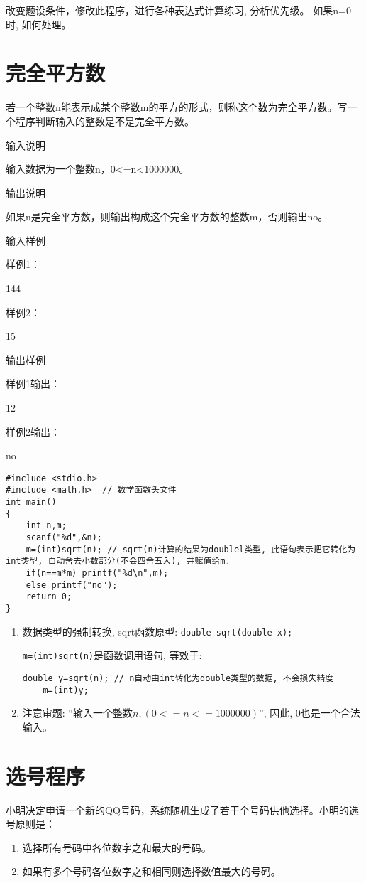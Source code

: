 \begin{note}
	改变题设条件，修改此程序，进行各种表达式计算练习, 分析优先级。 如果n=0时, 如何处理。
\end{note}

\section{完全平方数}
若一个整数n能表示成某个整数m的平方的形式，则称这个数为完全平方数。写一个程序判断输入的整数是不是完全平方数。

输入说明
	
输入数据为一个整数n，0<=n<1000000。

输出说明
	
如果n是完全平方数，则输出构成这个完全平方数的整数m，否则输出no。

输入样例
	
样例1：

144

样例2：

15

输出样例
	
样例1输出：

12

样例2输出：

no

\begin{lstlisting}
#include <stdio.h>
#include <math.h>  // 数学函数头文件
int main()
{
	int n,m;
	scanf("%d",&n);
	m=(int)sqrt(n); // sqrt(n)计算的结果为doublel类型, 此语句表示把它转化为int类型, 自动舍去小数部分(不会四舍五入), 并赋值给m。
	if(n==m*m) printf("%d\n",m);
	else printf("no");
	return 0;
} 
\end{lstlisting}

\begin{note}[要点]
	\begin{enumerate}
	\item 数据类型的强制转换, sqrt函数原型: \lstinline|double sqrt(double x);|
	
	\lstinline|m=(int)sqrt(n)|是函数调用语句, 等效于:
	\begin{lstlisting}[frame=none]
	double y=sqrt(n); // n自动由int转化为double类型的数据, 不会损失精度
	m=(int)y; 
	\end{lstlisting}
	\item 注意审题: ``输入一个整数$n, (0<=n<=1000000)$'', 因此, 0也是一个合法输入。
\end{enumerate}
\end{note}

\section{选号程序}
小明决定申请一个新的QQ号码，系统随机生成了若干个号码供他选择。小明的选号原则是：
\begin{enumerate}
	\item 选择所有号码中各位数字之和最大的号码。
	\item 如果有多个号码各位数字之和相同则选择数值最大的号码。
\end{enumerate}

